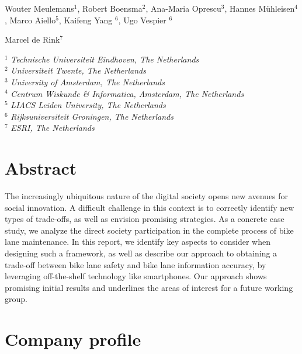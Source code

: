 \documentclass[a4paper,11pt]{article}
\begin{document}

\vspace{0.5em}


\vspace{2em}

\noindent Wouter Meulemans$^1$, Robert Boensma$^2$, Ana-Maria Oprescu$^3$, Hannes M\"uhleisen$^4$, Marco Aiello$^5$, Kaifeng Yang $^6$, Ugo Vespier $^6$

\vspace{1em}

\noindent Marcel de Rink$^7$

\vspace{1em}

\noindent $^1$ \emph{Technische Universiteit Eindhoven, The Netherlands}\\
\noindent $^2$ \emph{Universiteit Twente, The Netherlands}\\
\noindent $^3$ \emph{University of Amsterdam, The Netherlands}\\
\noindent $^4$ \emph{Centrum Wiskunde \& Informatica, Amsterdam, The Netherlands}\\
\noindent $^5$ \emph{LIACS Leiden University, The Netherlands}\\
\noindent $^6$ \emph{Rijksuniversiteit Groningen, The Netherlands}\\
\noindent $^7$ \emph{ESRI, The Netherlands}

\section{Abstract}

The increasingly ubiquitous nature of the digital society opens 
new avenues for social innovation. A difficult challenge in this context
is to correctly identify new types of trade-offs, as well as envision 
promising strategies. As a concrete case study, we analyze the direct society participation
in the complete process of bike lane maintenance. In this report, we identify 
key aspects to consider when designing such a framework, as well as describe
our approach to obtaining a trade-off between bike lane safety and 
bike lane information accuracy, by leveraging off-the-shelf technology like smartphones.
Our approach shows promising initial results and underlines the areas of interest for a future 
working group.
 

\section{Company profile}
\end{document}
